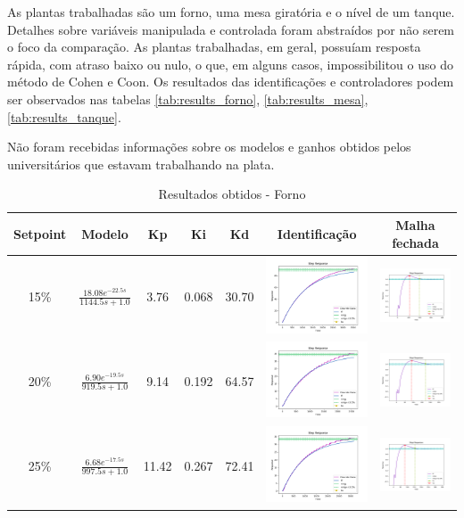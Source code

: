 As plantas trabalhadas são um forno, uma mesa giratória e o nível de um tanque.
Detalhes sobre variáveis manipulada e controlada foram abstraídos por não serem o foco da comparação.
As plantas trabalhadas, em geral, possuíam resposta rápida, com atraso baixo ou nulo, o que, em alguns casos,
impossibilitou o uso do método de Cohen e Coon. Os resultados das identificações e controladores podem ser observados
nas tabelas \ref{tab:results_forno}, \ref{tab:results_mesa}, \ref{tab:results_tanque}.


Não foram recebidas informações sobre os modelos e ganhos obtidos pelos universitários que estavam trabalhando na plata.


\begin{table}[!htbp]
\caption{Resultados obtidos - Forno}
\centering
\begin{tabular}{|c|c|c|c|c|c|c|}
\hline
\textbf{Setpoint} & \textbf{Modelo} & \textbf{Kp} & \textbf{Ki} & \textbf{Kd} & \textbf{Identificação} & \textbf{Malha fechada} \\
\hline
15\% & $\frac{18.08 e^{-22.5s}}{1144.5s + 1.0}$ & 3.76 & 0.068 & 30.70 & \includegraphics[width=0.2\linewidth]{figuras/forno_15} & \includegraphics[width=0.2\linewidth]{figuras/forno_15c} \\
\hline
20\% & $\frac{6.90 e^{-19.5s}}{919.5s + 1.0}$ & 9.14 & 0.192 & 64.57 & \includegraphics[width=0.2\linewidth]{figuras/forno_20} & \includegraphics[width=0.2\linewidth]{figuras/forno_20c} \\
\hline
25\% & $\frac{6.68 e^{-17.5s}}{997.5s + 1.0}$ & 11.42 & 0.267 & 72.41 & \includegraphics[width=0.2\linewidth]{figuras/forno_25} & \includegraphics[width=0.2\linewidth]{figuras/forno_25c} \\

\end{tabular}
\end{table}
